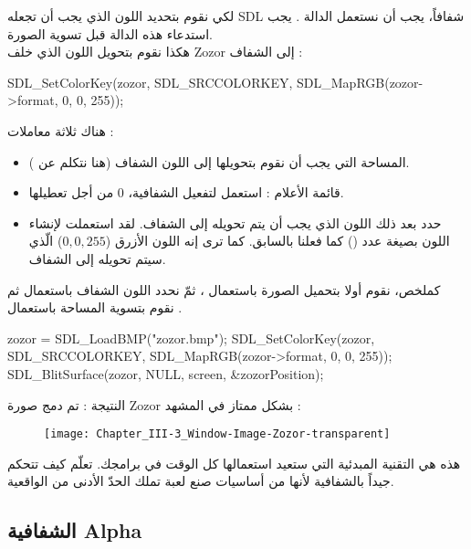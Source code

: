 لكي نقوم بتحديد اللون الذي يجب أن تجعله
\textenglish{SDL}
شفافاً، يجب أن نستعمل الدالة 
.
يجب استدعاء هذه الدالة قبل تسوية الصورة.\\
هكذا نقوم بتحويل اللون الذي خلف
\textenglish{Zozor}
إلى الشفاف :

\begin{Csource}
SDL_SetColorKey(zozor, SDL_SRCCOLORKEY, SDL_MapRGB(zozor->format, 0, 0, 255));
\end{Csource}

هناك ثلاثة معاملات :

\begin{itemize}
	\item المساحة التي يجب أن نقوم بتحويلها إلى اللون الشفاف (هنا نتكلم عن 
	).
	\item قائمة الأعلام : استعمل 
	لتفعيل الشفافية، 0 من أجل تعطيلها.
	\item حدد بعد ذلك اللون الذي يجب أن يتم تحويله إلى الشفاف. لقد استعملت
	لإنشاء اللون بصيغة عدد
	()
	كما فعلنا بالسابق. كما ترى إنه اللون الأزرق 
	($0, 0, 255$)
	 الّذي سيتم تحويله إلى الشفاف.
	
\end{itemize}

كملخص، نقوم أولا بتحميل الصورة باستعمال
،
ثمّ نحدد اللون الشفاف باستعمال
ثم نقوم بتسوية المساحة باستعمال
.

\begin{Csource}
zozor = SDL_LoadBMP("zozor.bmp");
SDL_SetColorKey(zozor, SDL_SRCCOLORKEY, SDL_MapRGB(zozor->format, 0, 0, 255));
SDL_BlitSurface(zozor, NULL, screen, &zozorPosition);
\end{Csource}

النتيجة : تم دمج صورة
\textenglish{Zozor}
بشكل ممتاز في المشهد :

\begin{figure}[H]
	\centering
	\texttt{[image: Chapter\_III-3\_Window-Image-Zozor-transparent]}
\end{figure}

هذه هي التقنية المبدئية التي ستعيد استعمالها كل الوقت في برامجك. تعلّم كيف تتحكم جيداً بالشفافية لأنها من أساسيات صنع لعبة تملك الحدّ الأدنى من الواقعية.

\subsection{الشفافية \textenglish{Alpha}}

